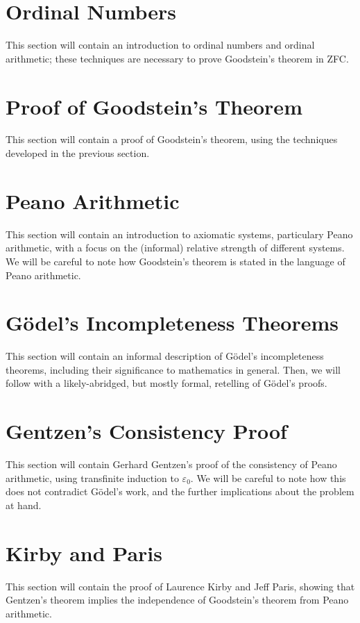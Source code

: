 \documentclass[10pt]{article}
\newcommand{\epz}{\varepsilon_0}
\begin{document}
\section{Ordinal Numbers}
This section will contain an introduction to ordinal numbers and ordinal arithmetic; these techniques are necessary to prove Goodstein's theorem in ZFC.

\section{Proof of Goodstein's Theorem}
This section will contain a proof of Goodstein's theorem, using the techniques developed in the previous section.

\section{Peano Arithmetic}
This section will contain an introduction to axiomatic systems, particulary Peano arithmetic, with a focus on the (informal) relative strength of different systems.
We will be careful to note how Goodstein's theorem is stated in the language of Peano arithmetic.

\section{G{\"o}del's Incompleteness Theorems}
This section will contain an informal description of G{\"o}del's incompleteness theorems, including their significance to mathematics in general.
Then, we will follow with a likely-abridged, but mostly formal, retelling of G{\"o}del's proofs.

\section{Gentzen's Consistency Proof}
This section will contain Gerhard Gentzen's proof of the consistency of Peano arithmetic, using transfinite induction to $\epz$.
We will be careful to note how this does not contradict G{\"o}del's work, and the further implications about the problem at hand.

\section{Kirby and Paris}
This section will contain the proof of Laurence Kirby and Jeff Paris, showing that Gentzen's theorem implies the independence of Goodstein's theorem from Peano arithmetic.
\end{document}
